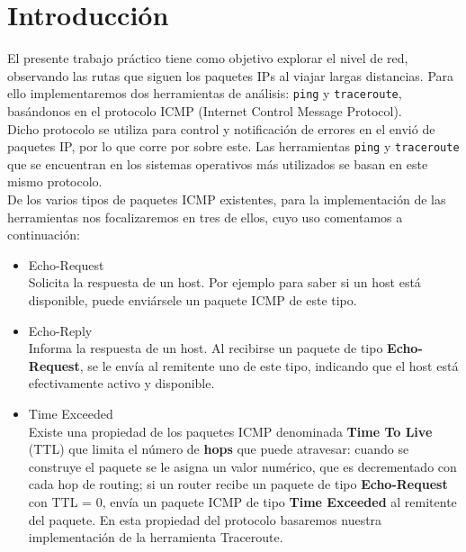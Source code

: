 
\section{Introducci\'on}

El presente trabajo pr\'actico tiene como objetivo explorar el nivel de red, observando las rutas que siguen los paquetes IPs al viajar largas distancias. Para ello implementaremos dos herramientas de análisis: \texttt{ping} y \texttt{traceroute},  basándonos en el protocolo ICMP (Internet Control Message Protocol).\\

Dicho protocolo se utiliza para control y notificaci\'on de errores en el envi\'o de paquetes IP, por lo que corre por sobre este. Las herramientas \texttt{ping} y \texttt{traceroute} que se encuentran en los sistemas operativos más utilizados se basan en este mismo protocolo.\\

De los varios tipos de paquetes ICMP existentes, para la implementaci\'on de las herramientas nos focalizaremos en tres de ellos, cuyo uso comentamos a continuación:

\begin{itemize}
 \item Echo-Request \\ 
 Solicita la respuesta de un host. Por ejemplo para saber si un host está disponible, puede enviársele un paquete ICMP de este tipo.
 \item Echo-Reply \\
 Informa la respuesta de un host. Al recibirse un paquete de tipo {\bf Echo-Request}, se le envía al remitente uno de este tipo, indicando que el host está efectivamente activo y disponible.
 \item Time Exceeded \\
 Existe una propiedad de los paquetes ICMP denominada {\bf Time To Live} (TTL) que limita el número de {\bf hops} que puede atravesar: cuando se construye el paquete se le asigna un valor numérico, que es decrementado con cada hop de routing; si un router recibe un paquete de tipo {\bf Echo-Request} con TTL = 0, envía un paquete ICMP de tipo {\bf Time Exceeded} al remitente del paquete. En esta propiedad del protocolo basaremos nuestra implementación de la herramienta Traceroute.
\end{itemize}


